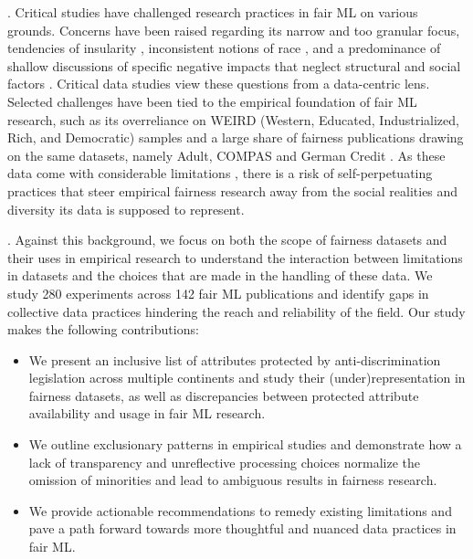 . Critical studies have challenged research practices in fair ML on various grounds. Concerns have been raised regarding its narrow and too granular focus, tendencies of insularity \citep{laufer2022four}, inconsistent notions of race \citep{abdu2023empirical}, and a predominance of shallow discussions of specific negative impacts that neglect structural and social factors \citep{birhane2022forgotten}. Critical data studies \citep{iliadis2016critical,boyd2012critical} view these questions from a data-centric lens. Selected challenges have been tied to the empirical foundation of fair ML research, such as its overreliance on WEIRD (Western, Educated, Industrialized, Rich, and Democratic) samples \citep{septiandri2023weird} and a large share of fairness publications drawing on the same datasets, namely Adult, COMPAS and German Credit \citep{fabris2022algorithmic}. As these data come with considerable limitations \citep{bao2022it, ding2021retiring}, there is a risk of self-perpetuating practices that steer empirical fairness research away from the social realities and diversity its data is supposed to represent.

. Against this background, we focus on both the scope of fairness datasets and their uses in empirical research to understand the interaction between limitations in datasets and the choices that are made in the handling of these data. We study 280 experiments across 142 fair ML publications and identify gaps in collective data practices hindering the reach and reliability of the field. Our study makes the following contributions:

\begin{itemize}
    \item We present an inclusive list of attributes protected by anti-discrimination legislation across multiple continents and study their (under)representation in fairness datasets, as well as discrepancies between protected attribute availability and usage in fair ML research.
    \item We outline exclusionary patterns in empirical studies and demonstrate how a lack of transparency and unreflective processing choices normalize the omission of minorities and lead to ambiguous results in fairness research. 
    \item We provide actionable recommendations to remedy existing limitations and pave a path forward towards more thoughtful and nuanced data practices in fair ML.
\end{itemize}

